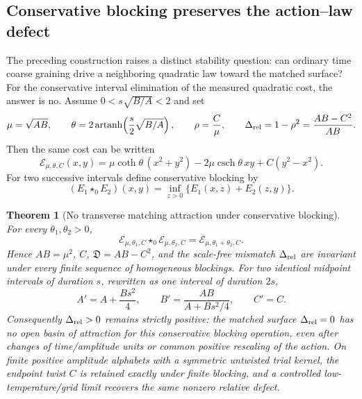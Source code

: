 \documentclass[11pt]{article}
\newtheorem{theorem}{Theorem}[section]
\numberwithin{equation}{section}
\theoremstyle{definition}
\theoremstyle{remark}
\begin{document}
\subsection{Conservative blocking preserves the action--law defect}
\label{subsec:homogeneous-blocking-main}

The preceding construction raises a distinct stability question: can ordinary
time coarse graining drive a neighboring quadratic law toward the matched
surface?  For the conservative interval elimination of the measured quadratic
cost, the answer is no.  Assume $0<s\sqrt{B/A}<2$ and set
\begin{equation}
 \mu=\sqrt{AB},\qquad
 \theta=2\operatorname{artanh}\!\left(\frac{s}{2}\sqrt{B/A}\right),\qquad
 \rho=\frac{C}{\mu},\qquad
 \Delta_{\rm rel}=1-\rho^2=\frac{AB-C^2}{AB}.
 \label{eq:main-relative-rank-defect}
\end{equation}
Then the same cost can be written
\begin{equation}
 \mathcal E_{\mu,\theta,C}(x,y)
 =\mu\coth\theta\,(x^2+y^2)-2\mu\operatorname{csch}\theta\,xy
   +C(y^2-x^2).
 \label{eq:main-hyperbolic-cost}
\end{equation}
For two successive intervals define conservative blocking by
\begin{equation}
 (E_1\star_0E_2)(x,y)=\inf_{z>0}\{E_1(x,z)+E_2(z,y)\}.
 \label{eq:main-conservative-blocking}
\end{equation}

\begin{theorem}[No transverse matching attraction under conservative blocking]
\label{thm:main-no-blocking-attractor}
For every $\theta_1,\theta_2>0$,
\begin{equation}
 \mathcal E_{\mu,\theta_1,C}\star_0
 \mathcal E_{\mu,\theta_2,C}
 =\mathcal E_{\mu,\theta_1+\theta_2,C}.
 \label{eq:main-hyperbolic-blocking}
\end{equation}
Hence $AB=\mu^2$, $C$, $\mathfrak D=AB-C^2$, and the scale-free mismatch
$\Delta_{\rm rel}$ are invariant under every finite sequence of homogeneous
blockings.  For two identical midpoint intervals of duration $s$, rewritten as
one interval of duration $2s$,
\begin{equation}
 A'=A+\frac{Bs^2}{4},\qquad
 B'=\frac{AB}{A+Bs^2/4},\qquad C'=C.
 \label{eq:main-homogeneous-block-map}
\end{equation}
Consequently $\Delta_{\rm rel}>0$ remains strictly positive: the matched surface
$\Delta_{\rm rel}=0$ has no open basin of attraction for this conservative
blocking operation, even after changes of time/amplitude units or common
positive rescaling of the action.  On finite positive amplitude alphabets with a symmetric untwisted trial
kernel, the endpoint twist $C$ is retained exactly under finite blocking, and a controlled
low-temperature/grid limit recovers the same nonzero relative defect.
\end{theorem}
\end{document}
